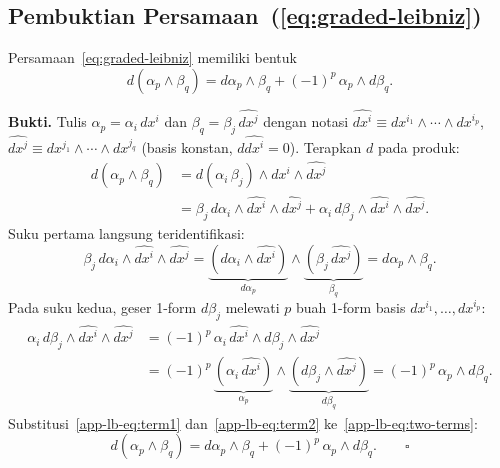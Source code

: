 \subsection{Pembuktian Persamaan~(\ref{eq:graded-leibniz})}
\label{app:proof-graded-leibniz}

Persamaan~\eqref{eq:graded-leibniz} memiliki bentuk
\begin{equation*}
    d(\alpha_p \wedge \beta_q) = d\alpha_p \wedge \beta_q + (-1)^p\,\alpha_p \wedge d\beta_q.
\end{equation*}

\noindent\textbf{Bukti.} Tulis $\alpha_p = \alpha_i\,\widehat{dx^i}$ dan $\beta_q = \beta_j\,\widehat{dx^j}$ dengan notasi $\widehat{dx^i} \equiv dx^{i_1} \wedge \cdots \wedge dx^{i_p}$, $\widehat{dx^j} \equiv dx^{j_1} \wedge \cdots \wedge dx^{j_q}$ (basis konstan, $d\widehat{dx^i} = 0$). Terapkan $d$ pada produk:
\begin{align}
    d(\alpha_p \wedge \beta_q)
    &= d(\alpha_i\,\beta_j) \wedge \widehat{dx^i} \wedge \widehat{dx^j} \nonumber\\[4pt]
    &= \beta_j\,d\alpha_i \wedge \widehat{dx^i} \wedge \widehat{dx^j}
    + \alpha_i\,d\beta_j \wedge \widehat{dx^i} \wedge \widehat{dx^j}. \label{app-lb-eq:two-terms}
\end{align}
Suku pertama langsung teridentifikasi:
\begin{equation}\label{app-lb-eq:term1}
    \beta_j\,d\alpha_i \wedge \widehat{dx^i} \wedge \widehat{dx^j}
    = \underbrace{(d\alpha_i \wedge \widehat{dx^i})}_{d\alpha_p} \wedge \underbrace{(\beta_j\,\widehat{dx^j})}_{\beta_q}
    = d\alpha_p \wedge \beta_q.
\end{equation}
Pada suku kedua, geser 1-form $d\beta_j$ melewati $p$ buah 1-form basis $dx^{i_1}, \ldots, dx^{i_p}$:
\begin{align}
    \alpha_i\,d\beta_j \wedge \widehat{dx^i} \wedge \widehat{dx^j}
    &= (-1)^p\,\alpha_i\,\widehat{dx^i} \wedge d\beta_j \wedge \widehat{dx^j} \nonumber\\[4pt]
    &= (-1)^p\,\underbrace{(\alpha_i\,\widehat{dx^i})}_{\alpha_p} \wedge \underbrace{(d\beta_j \wedge \widehat{dx^j})}_{d\beta_q}
    = (-1)^p\,\alpha_p \wedge d\beta_q. \label{app-lb-eq:term2}
\end{align}
Substitusi~\eqref{app-lb-eq:term1} dan~\eqref{app-lb-eq:term2} ke~\eqref{app-lb-eq:two-terms}:
\begin{equation}
    d(\alpha_p \wedge \beta_q) = d\alpha_p \wedge \beta_q + (-1)^p\,\alpha_p \wedge d\beta_q. \qquad\square
\end{equation}

